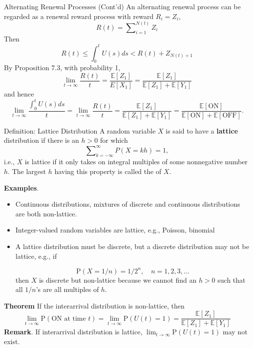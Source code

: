 \documentclass[letterpaper,handout, mathserif]{beamer}
\def\Sum{\sum\nolimits}
\def\p{\mathrm P}
\def\E{\mathbb E}
\begin{document}
\begin{frame}{Alternating Renewal Processes (Cont'd)}
An alternating renewal process can be regarded as a renewal reward process with reward $R_i= Z_i$,
$$
R(t) = \Sum_{i=1}^{N(t)}Z_i
$$
Then
$$
R(t)\le \int_0^t U(s)ds < R(t) + Z_{N(t)+1}
$$
By Proposition 7.3, with probability 1,
$$
\lim_{t\to\infty} \frac{R(t)}{t}=\frac{\E[Z_1]}{E[X_1]}=\frac{\E[Z_1]}{\E[Z_1] + \E[Y_1]}
$$
and hence
$$
\lim_{t\to\infty} \frac{\int_0^t U(s)ds}{t}=\lim_{t\to\infty} \frac{R(t)}{t}
=\frac{\E[Z_1]}{\E[Z_1] + \E[Y_1]}=\frac{\E[\text{ON}]}{\E[\text{ON}] + \E[\text{OFF}]}.
$$
\end{frame}
\begin{frame}{Definition: Lattice Distribution}
A random variable $X$ is said to have a {\bf lattice} distribution if there is
an $h > 0$ for which
$$\Sum_{k=-\infty}^{\infty} P(X = kh) = 1,$$
i.e., $X$ is lattice if it only takes on integral multiples of some nonnegative number $h.$
The largest $h$ having this property is called the  of $X$.\medskip

{\bf Examples}.
\begin{itemize}
\item Continuous distributions, mixtures of discrete and continuous distributions are both non-lattice.
\item Integer-valued random variables are lattice, e.g., Poisson, binomial
\item A lattice distribution must be discrete, but a discrete distribution may not be lattice,
e.g., if

\vspace{-12pt}
$$\p(X=1/n)=1/2^n,\quad n=1,2,3,\ldots$$
then $X$ is discrete but non-lattice because
we cannot find an $h>0$ such that all $1/n$'s are all multiples of $h$.
\end{itemize}
\end{frame}
\begin{frame}
{\bf Theorem} If the interarrival distribution is non-lattice, then
$$\lim_{t\to\infty}\p(\text{ON at time }t)
= \lim_{t\to\infty}\p(U(t) = 1) = \frac{\E[Z_1]}{\E[Z_1] + \E[Y_1]}$$
\medskip
{\bf Remark}. If interarrival distribution is lattice, $\lim_{t\to\infty}\p(U(t) = 1)$ may not exist.


\end{frame}
\end{document}
